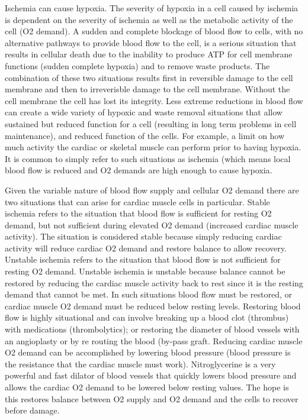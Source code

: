 Ischemia can cause hypoxia. The severity of hypoxia in a cell caused by ischemia is dependent on the severity of ischemia as well as the metabolic activity of the cell (O2 demand). A sudden and complete blockage of blood flow to cells, with no alternative pathways to provide blood flow to the cell, is a serious situation that results in cellular death due to the inability to produce ATP for cell membrane functions (sudden complete hypoxia) and to remove waste products. The combination of these two situations results first in reversible damage to the cell membrane and then to irreverisble damage to the cell membrane. Without the cell membrane the cell has lost its integrity. Less extreme reductions in blood flow can create a wide variety of hypoxic and waste removal situations that allow sustained but reduced function for a cell (resulting in long term problems in cell maintenance), and reduced function of the cells. For example, a limit on how much activity the cardiac or skeletal muscle can perform prior to having hypoxia. It is common to simply refer to such situations as ischemia (which means local blood flow is reduced and O2 demands are high enough to cause hypoxia. 

Given the variable nature of blood flow supply and cellular O2 demand there are two situations that can arise for cardiac muscle cells in particular. Stable ischemia refers to the situation that blood flow is sufficient for resting O2 demand, but not sufficient during elevated O2 demand (increased cardiac muscle activity). The situation is considered stable because simply reducing cardiac activity will reduce cardiac O2 demand and restore balance to allow recovery. Unstable ischemia refers to the situation that blood flow is not sufficient for resting O2 demand. Unstable ischemia is unstable because balance cannot be restored by reducing the cardiac muscle activity back to rest since it is the resting demand that cannot be met. In such situations blood flow must be restored, or cardiac muscle O2 demand must be reduced below resting levels. Restoring blood flow is highly situational and can involve breaking up a blood clot (thrombus) with medications (thrombolytics); or restoring the diameter of blood vessels with an angioplasty or by re routing the blood (by-pass graft. Reducing cardiac muscle O2 demand can be accomplished by lowering blood pressure (blood pressure is the resistance that the cardiac muscle must work). Nitroglycerine is a very powerful and fast dilator of blood vessels that quickly lowers blood pressure and allows the cardiac O2 demand to be lowered below resting values. The hope is this restores balance between O2 supply and O2 demand and the cells to recover before damage.

